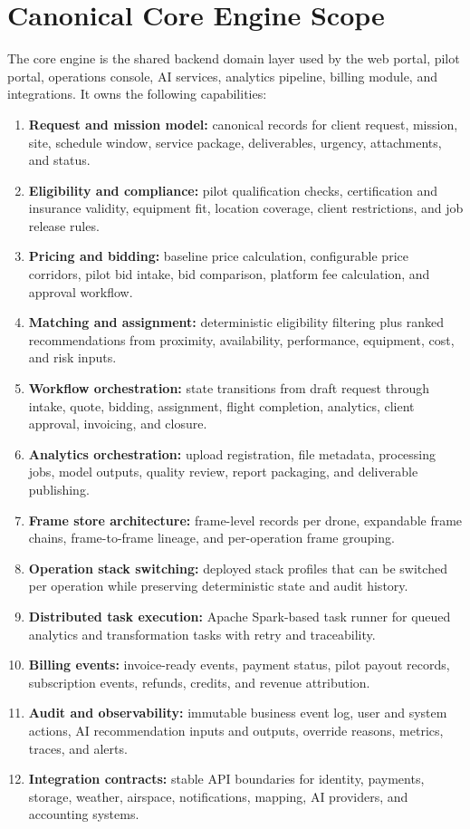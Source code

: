 \documentclass[11pt,a4paper]{article}
\begin{document}
\section{Canonical Core Engine Scope}

The core engine is the shared backend domain layer used by the web portal, pilot portal, operations console, AI services, analytics pipeline, billing module, and integrations. It owns the following capabilities:

\begin{enumerate}[leftmargin=*]
    \item \textbf{Request and mission model:} canonical records for client request, mission, site, schedule window, service package, deliverables, urgency, attachments, and status.
    \item \textbf{Eligibility and compliance:} pilot qualification checks, certification and insurance validity, equipment fit, location coverage, client restrictions, and job release rules.
    \item \textbf{Pricing and bidding:} baseline price calculation, configurable price corridors, pilot bid intake, bid comparison, platform fee calculation, and approval workflow.
    \item \textbf{Matching and assignment:} deterministic eligibility filtering plus ranked recommendations from proximity, availability, performance, equipment, cost, and risk inputs.
    \item \textbf{Workflow orchestration:} state transitions from draft request through intake, quote, bidding, assignment, flight completion, analytics, client approval, invoicing, and closure.
    \item \textbf{Analytics orchestration:} upload registration, file metadata, processing jobs, model outputs, quality review, report packaging, and deliverable publishing.
    \item \textbf{Frame store architecture:} frame-level records per drone, expandable frame chains, frame-to-frame lineage, and per-operation frame grouping.
    \item \textbf{Operation stack switching:} deployed stack profiles that can be switched per operation while preserving deterministic state and audit history.
    \item \textbf{Distributed task execution:} Apache Spark-based task runner for queued analytics and transformation tasks with retry and traceability.
    \item \textbf{Billing events:} invoice-ready events, payment status, pilot payout records, subscription events, refunds, credits, and revenue attribution.
    \item \textbf{Audit and observability:} immutable business event log, user and system actions, AI recommendation inputs and outputs, override reasons, metrics, traces, and alerts.
    \item \textbf{Integration contracts:} stable API boundaries for identity, payments, storage, weather, airspace, notifications, mapping, AI providers, and accounting systems.
\end{enumerate}
\end{document}
